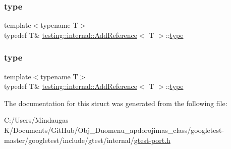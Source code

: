 \mbox{\label{structtesting_1_1internal_1_1_add_reference_a2df8dd7c4e41f6390e6e66b1a9a67bb4}} 
\subsubsection{\texorpdfstring{type}{type}\hspace{0.1cm}{\footnotesize\ttfamily [2/3]}}
{\footnotesize\ttfamily template$<$typename T$>$ \\
typedef T\& \mbox{\hyperlink{structtesting_1_1internal_1_1_add_reference}{testing\+::internal\+::\+Add\+Reference}}$<$ T $>$\+::\mbox{\hyperlink{structtesting_1_1internal_1_1_add_reference_a2df8dd7c4e41f6390e6e66b1a9a67bb4}{type}}}

\mbox{\label{structtesting_1_1internal_1_1_add_reference_a2df8dd7c4e41f6390e6e66b1a9a67bb4}} 
\subsubsection{\texorpdfstring{type}{type}\hspace{0.1cm}{\footnotesize\ttfamily [3/3]}}
{\footnotesize\ttfamily template$<$typename T$>$ \\
typedef T\& \mbox{\hyperlink{structtesting_1_1internal_1_1_add_reference}{testing\+::internal\+::\+Add\+Reference}}$<$ T $>$\+::\mbox{\hyperlink{structtesting_1_1internal_1_1_add_reference_a2df8dd7c4e41f6390e6e66b1a9a67bb4}{type}}}



The documentation for this struct was generated from the following file\+:\begin{DoxyCompactItemize}
\item 
C\+:/\+Users/\+Mindaugas K/\+Documents/\+Git\+Hub/\+Obj\+\_\+\+Duomenu\+\_\+apdorojimas\+\_\+class/googletest-\/master/googletest/include/gtest/internal/\mbox{\hyperlink{googletest-master_2googletest_2include_2gtest_2internal_2gtest-port_8h}{gtest-\/port.\+h}}\end{DoxyCompactItemize}
